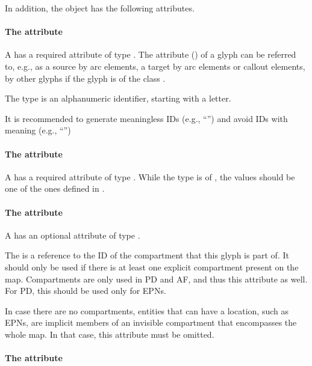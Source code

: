 In addition, the \Glyph object has the following attributes.

\paragraph{The \fixttspace{} attribute}

A \Glyph has a required attribute  of type . The  attribute () of a glyph can be referred to, e.g.,  as a source by arc elements, a target by arc elements or callout elements, by other glyphs if the glyph is of the class .

The  type is an alphanumeric identifier, starting with a letter.

It is recommended to generate meaningless IDs (e.g., ``'') and avoid IDs with meaning (e.g., ``'')


\paragraph{The \fixttspace{} attribute}

A \Glyph has a required attribute  of type
. While the type is of , the values should be one of the ones defined in .

\paragraph{The \fixttspace{} attribute}

A \Glyph has an optional attribute  of type
.

The  is a reference to the ID of the compartment that this glyph is part of. It should only be used if there is at least one explicit compartment present on the map. Compartments are only used in PD and AF, and thus this attribute as well. For PD, this should be used only for EPNs.

In case there are no compartments, entities that can have a location, such as EPNs, are implicit members of an invisible compartment that encompasses the whole map. In that case, this attribute must be omitted.

\paragraph{The \fixttspace{} attribute}

